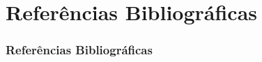 \documentclass{beamer}
\begin{document}
    

\section{Referências Bibliográficas}

\begin{frame}
    \frametitle{Referências Bibliográficas}
    \scriptsize{  
        
        
    }
  
\end{frame}
\end{document}
